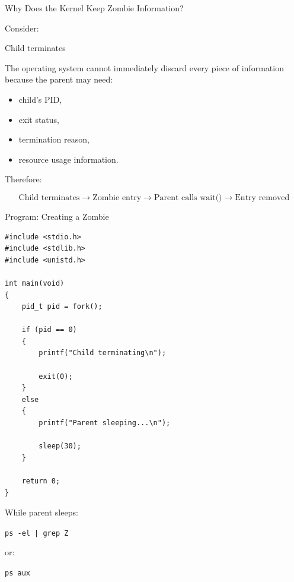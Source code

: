 \documentclass[aspectratio=169]{beamer}
\begin{document}
\begin{frame}{Why Does the Kernel Keep Zombie Information?}

Consider:

\begin{center}
Child terminates
\end{center}

The operating system cannot immediately discard every piece of information
because the parent may need:

\begin{itemize}

    \item child's PID,

    \item exit status,

    \item termination reason,

    \item resource usage information.

\end{itemize}

Therefore:

\[
\text{Child terminates}
\rightarrow
\text{Zombie entry}
\rightarrow
\text{Parent calls wait()}
\rightarrow
\text{Entry removed}
\]

\end{frame}

\begin{frame}[fragile]{Program: Creating a Zombie}

\begin{lstlisting}[style=cstyle]
#include <stdio.h>
#include <stdlib.h>
#include <unistd.h>

int main(void)
{
    pid_t pid = fork();

    if (pid == 0)
    {
        printf("Child terminating\n");

        exit(0);
    }
    else
    {
        printf("Parent sleeping...\n");

        sleep(30);
    }

    return 0;
}
\end{lstlisting}

While parent sleeps:

\begin{center}
\texttt{ps -el | grep Z}
\end{center}

or:

\begin{center}
\texttt{ps aux}
\end{center}

\end{frame}
\end{document}
